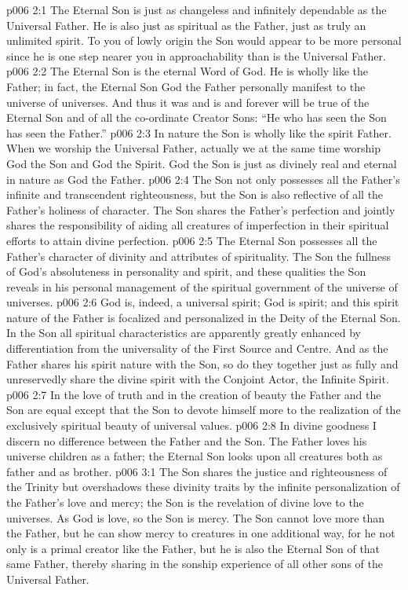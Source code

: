 \vs p006 2:1 The Eternal Son is just as changeless and infinitely dependable as the Universal Father. He is also just as spiritual as the Father, just as truly an unlimited spirit. To you of lowly origin the Son would appear to be more personal since he is one step nearer you in approachability than is the Universal Father.
\vs p006 2:2 The Eternal Son is the eternal Word of God. He is wholly like the Father; in fact, the Eternal Son  God the Father personally manifest to the universe of universes. And thus it was and is and forever will be true of the Eternal Son and of all the co\hyp{}ordinate Creator Sons: “He who has seen the Son has seen the Father.”
\vs p006 2:3 In nature the Son is wholly like the spirit Father. When we worship the Universal Father, actually we at the same time worship God the Son and God the Spirit. God the Son is just as divinely real and eternal in nature as God the Father.
\vs p006 2:4 The Son not only possesses all the Father’s infinite and transcendent righteousness, but the Son is also reflective of all the Father’s holiness of character. The Son shares the Father’s perfection and jointly shares the responsibility of aiding all creatures of imperfection in their spiritual efforts to attain divine perfection.
\vs p006 2:5 The Eternal Son possesses all the Father’s character of divinity and attributes of spirituality. The Son  the fullness of God’s absoluteness in personality and spirit, and these qualities the Son reveals in his personal management of the spiritual government of the universe of universes.
\vs p006 2:6 God is, indeed, a universal spirit; God is spirit; and this spirit nature of the Father is focalized and personalized in the Deity of the Eternal Son. In the Son all spiritual characteristics are apparently greatly enhanced by differentiation from the universality of the First Source and Centre. And as the Father shares his spirit nature with the Son, so do they together just as fully and unreservedly share the divine spirit with the Conjoint Actor, the Infinite Spirit.
\vs p006 2:7 In the love of truth and in the creation of beauty the Father and the Son are equal except that the Son  to devote himself more to the realization of the exclusively spiritual beauty of universal values.
\vs p006 2:8 In divine goodness I discern no difference between the Father and the Son. The Father loves his universe children as a father; the Eternal Son looks upon all creatures both as father and as brother.
\vs p006 3:1 The Son shares the justice and righteousness of the Trinity but overshadows these divinity traits by the infinite personalization of the Father’s love and mercy; the Son is the revelation of divine love to the universes. As God is love, so the Son is mercy. The Son cannot love more than the Father, but he can show mercy to creatures in one additional way, for he not only is a primal creator like the Father, but he is also the Eternal Son of that same Father, thereby sharing in the sonship experience of all other sons of the Universal Father.
